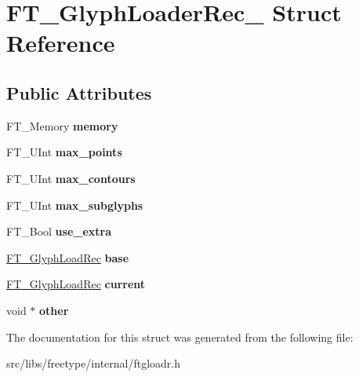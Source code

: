 \hypertarget{struct_f_t___glyph_loader_rec__}{
\section{FT\_\-GlyphLoaderRec\_\- Struct Reference}
\label{struct_f_t___glyph_loader_rec__}
}
\subsection*{Public Attributes}
\begin{DoxyCompactItemize}
\item 
\hypertarget{struct_f_t___glyph_loader_rec___a9120a7808ee59d24dd52409e609907a2}{
FT\_\-Memory {\bfseries memory}}
\label{struct_f_t___glyph_loader_rec___a9120a7808ee59d24dd52409e609907a2}

\item 
\hypertarget{struct_f_t___glyph_loader_rec___a62339fa7a06e0b4ddecd5db2aa606741}{
FT\_\-UInt {\bfseries max\_\-points}}
\label{struct_f_t___glyph_loader_rec___a62339fa7a06e0b4ddecd5db2aa606741}

\item 
\hypertarget{struct_f_t___glyph_loader_rec___a808ccf46597572d953f387e705f10a36}{
FT\_\-UInt {\bfseries max\_\-contours}}
\label{struct_f_t___glyph_loader_rec___a808ccf46597572d953f387e705f10a36}

\item 
\hypertarget{struct_f_t___glyph_loader_rec___a2d5b00d7caf624ed2b4f6fd2db3228db}{
FT\_\-UInt {\bfseries max\_\-subglyphs}}
\label{struct_f_t___glyph_loader_rec___a2d5b00d7caf624ed2b4f6fd2db3228db}

\item 
\hypertarget{struct_f_t___glyph_loader_rec___a54009985acda32d83f2f124e28c5d00a}{
FT\_\-Bool {\bfseries use\_\-extra}}
\label{struct_f_t___glyph_loader_rec___a54009985acda32d83f2f124e28c5d00a}

\item 
\hypertarget{struct_f_t___glyph_loader_rec___ae80dfc17f20bfce8c60ffaaba95c821b}{
\hyperlink{struct_f_t___glyph_load_rec__}{FT\_\-GlyphLoadRec} {\bfseries base}}
\label{struct_f_t___glyph_loader_rec___ae80dfc17f20bfce8c60ffaaba95c821b}

\item 
\hypertarget{struct_f_t___glyph_loader_rec___a271b1b9604746ed08cf6613710ebb4c1}{
\hyperlink{struct_f_t___glyph_load_rec__}{FT\_\-GlyphLoadRec} {\bfseries current}}
\label{struct_f_t___glyph_loader_rec___a271b1b9604746ed08cf6613710ebb4c1}

\item 
\hypertarget{struct_f_t___glyph_loader_rec___a9c58c5b06f0135fe5cef16bd85d939e3}{
void $\ast$ {\bfseries other}}
\label{struct_f_t___glyph_loader_rec___a9c58c5b06f0135fe5cef16bd85d939e3}

\end{DoxyCompactItemize}


The documentation for this struct was generated from the following file:\begin{DoxyCompactItemize}
\item 
src/libs/freetype/internal/ftgloadr.h\end{DoxyCompactItemize}
